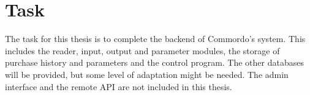 
\section{Task}\label{sec:task}

The task for this thesis is to complete the backend of Commordo's system. This includes the reader, input, output and parameter modules, the storage of purchase history and parameters and the control program. The other databases will be provided, but some level of adaptation might be needed. The admin interface and the remote API are not included in this thesis.

